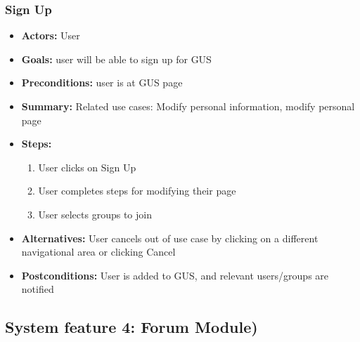 			\subsubsection{Sign Up}
			\begin{itemize}
				\item{\textbf{Actors:} User}
				\item{\textbf{Goals:} user will be able to sign up for GUS}
				\item{\textbf{Preconditions:} user is at GUS page}
				\item{\textbf{Summary:} Related use cases: Modify personal information, modify personal page}
				\item{\textbf{Steps:}
				\begin{enumerate}
					\item{User clicks on Sign Up}
					\item{User completes steps for modifying their page}
					\item{User selects groups to join}
				\end{enumerate}
				}
				\item{\textbf{Alternatives:} User cancels out of use case by clicking on a different navigational area or clicking Cancel}
				\item{\textbf{Postconditions:} User is added to GUS, and relevant users/groups are notified}
			\end{itemize}

			\subsection{System feature 4: Forum Module)}
